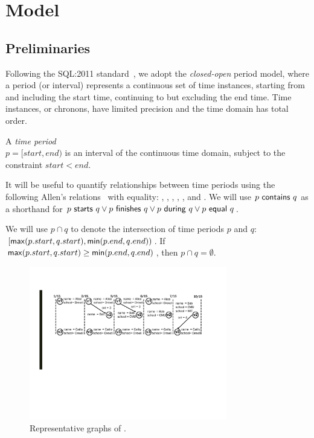 \section{Model}
\label{sec:model}

\subsection{Preliminaries}
\label{sec:model:prelim}

Following the SQL:2011
standard~\cite{DBLP:journals/sigmod/KulkarniM12}, we adopt the {\em
  closed-open} period model, where a period (or interval) represents a
continuous set of time instances, starting from and including the
start time, continuing to but excluding the end time.  Time instances,
or chronons, have limited precision and the time domain has total
order.

\begin{definition}
A {\em time period} \\$p = [start, end)$ is an interval of the
  continuous time domain, subject to the constraint $start < end$.
\label{def:period} 
\vspace{-0.2cm}
\end{definition}

It will be useful to quantify relationships between time periods using
the following Allen's relations~\cite{allen83} with equality:
, , ,
, , and .  We
will use $p~\mathsf{contains}~q$ as a shorthand for
$p~\mathsf{starts}~q \vee p~\mathsf{finishes}~q \vee
p~\mathsf{during}~q \vee p~\mathsf{equal}~q$.

We will use $p \cap q$ to denote the intersection of time periods $p$
and $q$: $[\mathsf{max}(p.start,q.start), \mathsf{min}(p.end,
  q.end))$.  If $\mathsf{max}(p.start,q.start) \geq
  \mathsf{min}(p.end, q.end)$, then $p \cap q = \emptyset$.

\begin{figure}
\includegraphics[width=3.4in]{figs/T1_graphs.pdf}
\vspace{-0.5cm}
\caption{Representative graphs of \tg {}.}
\vspace{-0.3cm}
\label{fig:tg_rg}
\end{figure}

